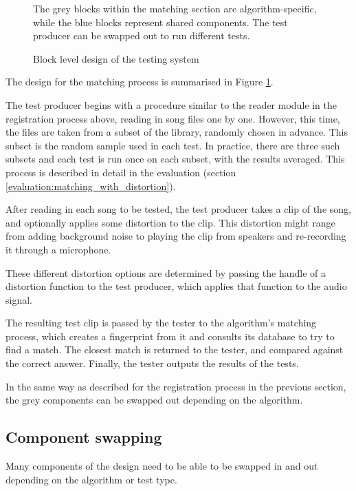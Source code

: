 \documentclass[12pt,a4paper,twoside,openright]{report}
\begin{document}
\begin{figure}[htb]
  \centering
  
  \caption{Block level design of the testing system}
  \label{figs:matching_design}
  \medskip \small
  The grey blocks within the matching section are algorithm-specific, while the blue blocks represent shared components. The test producer can be swapped out to run different tests.
\end{figure}

The design for the matching process is summarised in Figure \ref{figs:matching_design}.

The test producer begins with a procedure similar to the reader module in the registration process above, reading in song files one by one. However, this time, the files are taken from a subset of the library, randomly chosen in advance. This subset is the random sample used in each test. In practice, there are three such subsets and each test is run once on each subset, with the results averaged. This process is described in detail in the evaluation (section \ref{evaluation:matching_with_distortion}).

After reading in each song to be tested, the test producer takes a clip of the song, and optionally applies some distortion to the clip. This distortion might range from adding background noise to playing the clip from speakers and re-recording it through a microphone.

These different distortion options are determined by passing the handle of a distortion function to the test producer, which applies that function to the audio signal.

The resulting test clip is passed by the tester to the algorithm's matching process, which creates a fingerprint from it and consults its database to try to find a match. The closest match is returned to the tester, and compared against the correct answer. Finally, the tester outputs the results of the tests.

In the same way as described for the registration process in the previous section, the grey components can be swapped out depending on the algorithm.


\subsection{Component swapping}

Many components of the design need to be able to be swapped in and out depending on the algorithm or test type. 
\end{document}
